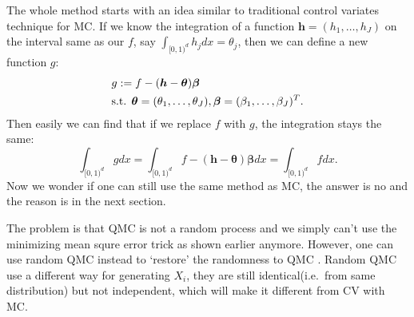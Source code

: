 

The whole method starts with an idea similar to traditional control variates technique for MC.
If we know the integration of a function $\boldsymbol{h}=(h_1,\dots,h_J)$ on the interval same as our $f$, say $\int_{[0,1)^d}h_jdx=\theta_j$, then we can define a new function $g$:
\begin{align}\label{eq:defg}
    & g:=f-(\boldsymbol{h}-\boldsymbol{\theta})\boldsymbol{\beta}\\
    \notag
    &\text{s.t. }\boldsymbol{\theta}=(\theta_1,\dots,\theta_J),
    \boldsymbol{\beta}=(\beta_1,\dots,\beta_J)^T.
\end{align}
Then easily we can find that if we replace $f$ with $g$, the integration stays the same:
\[
	\int_{[0,1)^d}gdx
        =\int_{[0,1)^d}f-(\boldsymbol{h}-\boldsymbol{\theta})\boldsymbol{\beta}dx
			=\int_{[0,1)^d}fdx.
\]
Now we wonder if one can still use the same method as MC, the answer is no and the reason is in the next section. 


The problem is that QMC is not a random process and we simply can't use the minimizing mean squre error trick as shown earlier anymore. However, one can use random QMC instead to `restore' the randomness to QMC \cite{}. 
Random QMC use a different way for generating $X_i$, they are still identical(i.e.\ from same distribution) but not independent, which will make it different from CV with MC.

